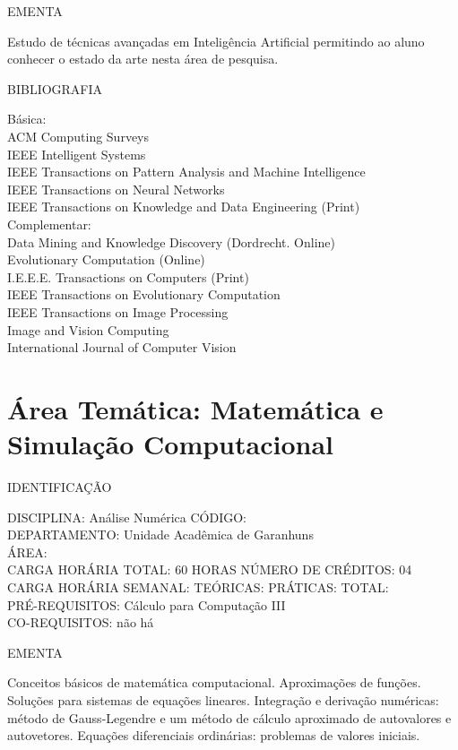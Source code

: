 \documentclass[
	12pt,				%
	openright,			%
  oneside,     %
	a4paper,			%
	english,			%
	french,				%
	spanish,			%
	brazil				%
	]{abntex2}
\begin{document}
\begin{apendicesenv}
EMENTA 

Estudo de técnicas avançadas em Inteligência Artificial permitindo ao
aluno conhecer o estado da arte nesta área de pesquisa.

BIBLIOGRAFIA 

Básica:\\
ACM Computing Surveys\\
IEEE Intelligent Systems\\
IEEE Transactions on Pattern Analysis and Machine Intelligence\\
IEEE Transactions on Neural Networks\\
IEEE Transactions on Knowledge and Data Engineering (Print)\\
Complementar:\\
Data Mining and Knowledge Discovery (Dordrecht. Online)\\
Evolutionary Computation (Online)\\
I.E.E.E. Transactions on Computers (Print)\\
IEEE Transactions on Evolutionary Computation\\
IEEE Transactions on Image Processing\\
Image and Vision Computing\\
International Journal of Computer Vision
\newpage

\section*{Área Temática: Matemática e Simulação Computacional}

IDENTIFICAÇÃO

DISCIPLINA: Análise Numérica CÓDIGO:\\ 
DEPARTAMENTO: Unidade Acadêmica de Garanhuns\\
ÁREA: \\
CARGA HORÁRIA TOTAL: 60 HORAS NÚMERO DE CRÉDITOS: 04\\
CARGA HORÁRIA SEMANAL: TEÓRICAS: PRÁTICAS: TOTAL: \\
PRÉ-REQUISITOS: Cálculo para Computação III\\
CO-REQUISITOS: não há

EMENTA 

Conceitos básicos de matemática computacional. Aproximações de funções.
Soluções para sistemas de equações lineares. Integração e derivação
numéricas: método de Gauss-Legendre e um método de cálculo aproximado
de autovalores e autovetores. Equações diferenciais ordinárias:
problemas de valores iniciais.


\end{apendicesenv}
\end{document}
